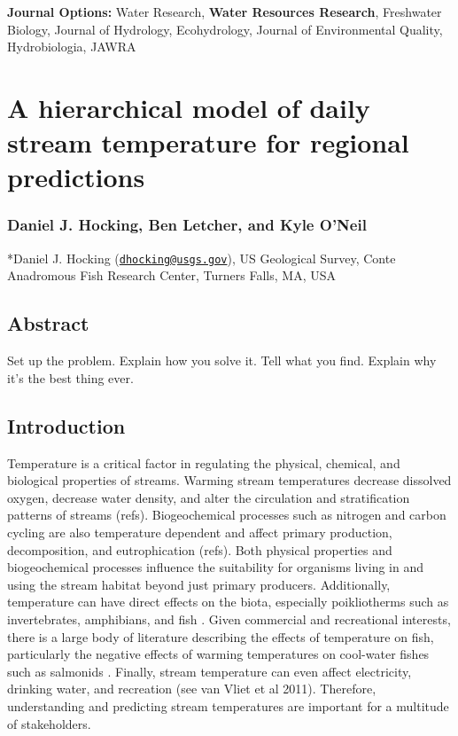 \documentclass[]{article}
\date{}
\begin{document}
\textbf{Journal Options:} Water Research, \textbf{Water Resources
Research}, Freshwater Biology, Journal of Hydrology, Ecohydrology,
Journal of Environmental Quality, Hydrobiologia, JAWRA

\section{A hierarchical model of daily stream temperature for regional
predictions}\label{a-hierarchical-model-of-daily-stream-temperature-for-regional-predictions}

\subsubsection{Daniel J. Hocking, Ben Letcher, and Kyle
O'Neil}\label{daniel-j.-hocking-ben-letcher-and-kyle-oneil}

*Daniel J. Hocking
(\href{mailto:dhocking@usgs.gov}{\nolinkurl{dhocking@usgs.gov}}), US
Geological Survey, Conte Anadromous Fish Research Center, Turners Falls,
MA, USA

\subsection{Abstract}\label{abstract}

Set up the problem. Explain how you solve it. Tell what you find.
Explain why it's the best thing ever.

\subsection{Introduction}\label{introduction}

Temperature is a critical factor in regulating the physical, chemical,
and biological properties of streams. Warming stream temperatures
decrease dissolved oxygen, decrease water density, and alter the
circulation and stratification patterns of streams (refs).
Biogeochemical processes such as nitrogen and carbon cycling are also
temperature dependent and affect primary production, decomposition, and
eutrophication (refs). Both physical properties and biogeochemical
processes influence the suitability for organisms living in and using
the stream habitat beyond just primary producers. Additionally,
temperature can have direct effects on the biota, especially
poikliotherms such as invertebrates, amphibians, and fish
\citep[e.g.,][]{Kanno2013, Xu2010, Xu2010a, Al-Chokhachy2013a}. Given
commercial and recreational interests, there is a large body of
literature describing the effects of temperature on fish, particularly
the negative effects of warming temperatures on cool-water fishes such
as salmonids . Finally, stream temperature can even affect electricity,
drinking water, and recreation (see van Vliet et al 2011). Therefore,
understanding and predicting stream temperatures are important for a
multitude of stakeholders.
\end{document}
